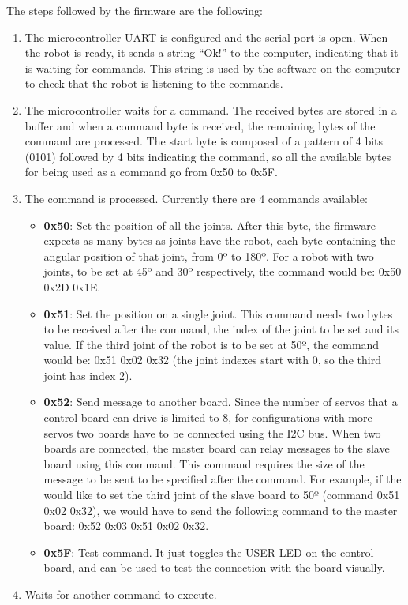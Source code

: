 The steps followed by the firmware are the following:
\begin{enumerate}
	\item The microcontroller UART is configured and the serial port is open. When the robot is ready, it sends a string ``Ok!'' to the computer, indicating that it is waiting for commands. This string is used by the software on the computer to check that the robot is listening to the commands.
	
	\item The microcontroller waits for a command. The received bytes are stored in a buffer and when a command byte is received, the remaining bytes of the command are processed. The start byte is composed of a pattern of 4 bits (0101) followed by 4 bits indicating the command, so all the available bytes for being used as a command go from 0x50 to 0x5F.
	
	\item The command is processed. Currently there are 4 commands available:
		\begin{itemize}
			\item \textbf{0x50}: Set the position of all the joints. After this byte, the firmware expects as many bytes as joints have the robot, each byte containing the angular position of that joint, from 0º to 180º. For a robot with two joints, to be set at 45º and 30º respectively, the command would be: 0x50 0x2D 0x1E.
			
			\item \textbf{0x51}: Set the position on a single joint. This command needs two bytes to be received after the command, the index of the joint to be set and its value. If the third joint of the robot is to be set at 50º, the command would be: 0x51 0x02 0x32 (the joint indexes start with 0, so the third joint has index 2).
		
			\item \textbf{0x52}: Send message to another board. Since the number of servos that a control board can drive is limited to 8, for configurations with more servos two boards have to be connected using the I2C bus. When two boards are connected, the master board can relay messages to the slave board using this command. This command requires the size of the message to be sent to be specified after the command. For example, if the would like to set the third joint of the slave board to 50º (command 0x51 0x02 0x32), we would have to send the following command to the master board: 0x52 0x03 0x51 0x02 0x32.
			
			\item \textbf{0x5F}: Test command. It just toggles the USER LED on the control board, and can be used to test the connection with the board visually.
		\end{itemize}
		
	\item Waits for another command to execute.
\end{enumerate}

